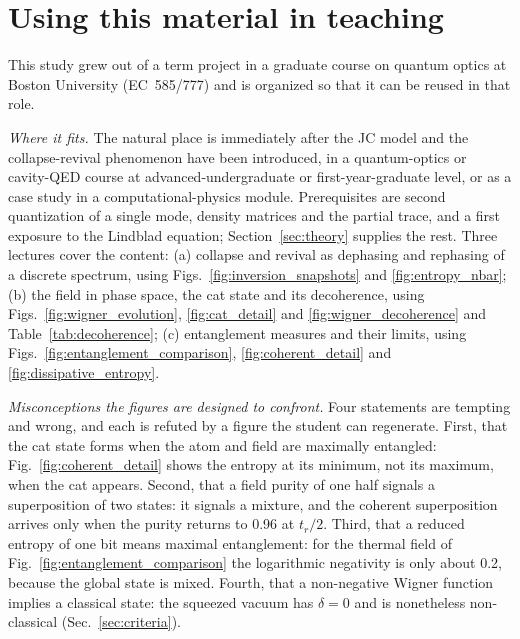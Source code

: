\documentclass{iopjournal}
\begin{document}
\section{Using this material in teaching}
\label{sec:teaching}

This study grew out of a term project in a graduate course on quantum optics at Boston University (EC~585/777) and is organized so that it can be reused in that role.

\textit{Where it fits.} The natural place is immediately after the JC model and the collapse-revival phenomenon have been introduced, in a quantum-optics or cavity-QED course at advanced-undergraduate or first-year-graduate level, or as a case study in a computational-physics module. Prerequisites are second quantization of a single mode, density matrices and the partial trace, and a first exposure to the Lindblad equation; Section~\ref{sec:theory} supplies the rest. Three lectures cover the content: (a) collapse and revival as dephasing and rephasing of a discrete spectrum, using Figs.~\ref{fig:inversion_snapshots} and \ref{fig:entropy_nbar}; (b) the field in phase space, the cat state and its decoherence, using Figs.~\ref{fig:wigner_evolution}, \ref{fig:cat_detail} and \ref{fig:wigner_decoherence} and Table~\ref{tab:decoherence}; (c) entanglement measures and their limits, using Figs.~\ref{fig:entanglement_comparison}, \ref{fig:coherent_detail} and \ref{fig:dissipative_entropy}.

\textit{Misconceptions the figures are designed to confront.} Four statements are tempting and wrong, and each is refuted by a figure the student can regenerate. First, that the cat state forms when the atom and field are maximally entangled: Fig.~\ref{fig:coherent_detail} shows the entropy at its minimum, not its maximum, when the cat appears. Second, that a field purity of one half signals a superposition of two states: it signals a mixture, and the coherent superposition arrives only when the purity returns to 0.96 at $t_r/2$. Third, that a reduced entropy of one bit means maximal entanglement: for the thermal field of Fig.~\ref{fig:entanglement_comparison} the logarithmic negativity is only about 0.2, because the global state is mixed. Fourth, that a non-negative Wigner function implies a classical state: the squeezed vacuum has $\delta = 0$ and is nonetheless non-classical (Sec.~\ref{sec:criteria}).
\end{document}
